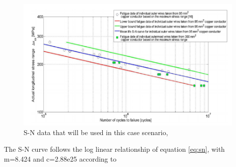 \begin{figure}[H]
\centering
\includegraphics[scale=0.6]{figures/SNplot}
\caption[$\; \:$S-N data]{S-N data that will be used in this case scenario,\cite{savik2014} }
 \label{fig:snplot}
\end{figure}
\noindent The S-N curve follows the log linear relationship of equation \ref{eq:sn}, with m=8.424 and c=2.88e25 according to \cite{Nasution2013}